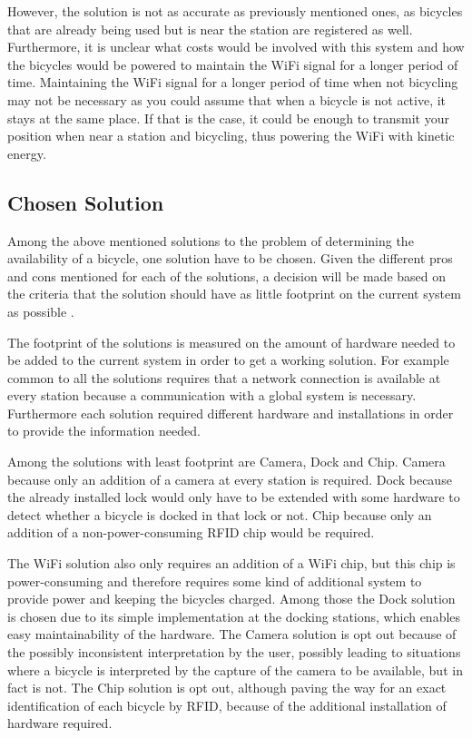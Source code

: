 However, the solution is not as accurate as previously mentioned ones, as bicycles that are already being used but is near the station are registered as well.
Furthermore, it is unclear what costs would be involved with this system and how the bicycles would be powered to maintain the WiFi signal for a longer period of time. 
Maintaining the WiFi signal for a longer period of time when not bicycling may not be necessary as you could assume that when a bicycle is not active, it stays at the same place.
If that is the case, it could be enough to transmit your position when near a station and bicycling, thus powering the WiFi with kinetic energy.

\subsection{Chosen Solution}
Among the above mentioned solutions to the problem of determining the availability of a bicycle, one solution have to be chosen. 
Given the different pros and cons mentioned for each of the solutions, a decision will be made based on the criteria that the solution should have as little footprint on the current system as possible . 

The footprint of the solutions is measured on the amount of hardware needed to be added to the current system in order to get a working solution. 
For example common to all the solutions requires that a network connection is available at every station because a communication with a global system is necessary. 
Furthermore each solution required different hardware and installations in order to provide the information needed. 

Among the solutions with least footprint are Camera, Dock and Chip. 
Camera because only an addition of a camera at every station is required. 
Dock because the already installed lock would only have to be extended with some hardware to detect whether a bicycle is docked in that lock or not.
Chip because only an addition of a non-power-consuming RFID chip would be required.

The WiFi solution also only requires an addition of a WiFi chip, but this chip is power-consuming and therefore requires some kind of additional system to provide power and keeping the bicycles charged.
Among those the Dock solution is chosen due to its simple implementation at the docking stations, which enables easy maintainability of the hardware. The Camera solution is opt out because of the possibly inconsistent interpretation by the user, possibly leading to situations where a bicycle is interpreted by the capture of the camera to be available, but in fact is not. The Chip solution is opt out, although paving the way for an exact identification of each bicycle by RFID, because of the additional installation of hardware required.

